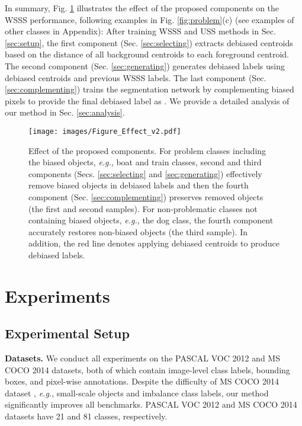 \documentclass[10pt,twocolumn,letterpaper]{article}
\begin{document}
In summary, Fig. \ref{fig:effect} illustrates the effect of the proposed components on the WSSS performance, following examples in Fig. \ref{fig:problem}(c) (see examples of other classes in Appendix): After training WSSS and USS methods in Sec. \ref{sec:setup}, the first component (Sec. \ref{sec:selecting}) extracts debiased centroids   based on the distance of all background centroids to each foreground centroid. The second component (Sec. \ref{sec:generating}) generates debiased labels  using debiased centroids and previous WSSS labels. The last component (Sec. \ref{sec:complementing}) trains the segmentation network by complementing biased pixels to provide the final debiased label as . We provide a detailed analysis of our method in Sec. \ref{sec:analysis}.


\begin{figure}[t]
  \centering
\texttt{[image: images/Figure\_Effect\_v2.pdf]}
\caption{
      Effect of the proposed components. For problem classes including the biased objects, \emph{e.g.}, boat and train classes, second and third components (Secs. \ref{sec:selecting} and \ref{sec:generating}) effectively remove biased objects in debiased labels  and then the fourth component (Sec. \ref{sec:complementing}) preserves removed objects (the first and second samples). For non-problematic classes not containing biased objects, \emph{e.g.}, the dog class, the fourth component accurately restores non-biased objects (the third sample). In addition, the red line denotes applying debiased centroids to produce debiased labels. }
  \label{fig:effect}
\vspace{-0.4cm}
\end{figure}

\section{Experiments}\label{sec:exper}

\subsection{Experimental Setup}



\textbf{Datasets.} We conduct all experiments on the PASCAL VOC 2012 \cite{everingham2010pascal} and MS COCO 2014 \cite{lin2014microsoft} datasets, both of which contain image-level class labels, bounding boxes, and pixel-wise annotations. Despite the difficulty of MS COCO 2014 dataset \cite{lin2014microsoft}, \emph{e.g.}, small-scale objects and imbalance class labels, our method significantly improves all benchmarks. PASCAL VOC 2012 \cite{everingham2010pascal} and MS COCO 2014 \cite{lin2014microsoft} datasets have 21 and 81 classes, respectively. 
\end{document}
